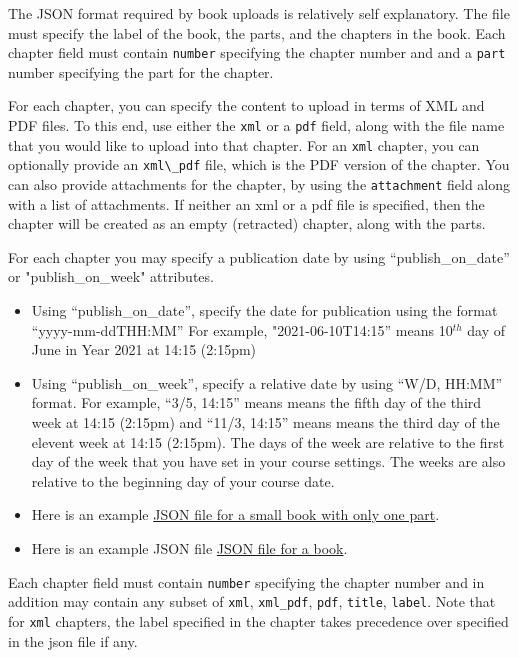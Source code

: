 \begin{gram}
The JSON format required by book uploads is relatively self explanatory.
The file must specify the label of the book, the parts, and the chapters in the book. 
%
Each chapter field must contain \verb|number| specifying the chapter
number and and a \verb|part| number specifying the part for the chapter.

For each chapter, you can specify the content to upload in terms of
XML and PDF files.  To this end, use either the \lstinline{xml} or a
\lstinline{pdf} field, along with the file name that you would like to
upload into that chapter.
%
For an \lstinline{xml} chapter, you can optionally provide an
\lstinline{xml\_pdf} file, which is the PDF version of the chapter.
%
You can also provide attachments for the chapter, by using the
\lstinline{attachment} field along with a list of attachments.
%
If neither an xml or a pdf file is specified, then the chapter will be
created as an empty (retracted) chapter, along with the parts.


For each chapter you may specify a publication date by using
``publish_on_date'' or "publish_on_week" attributes.


\begin{itemize}
\item Using ``publish_on_date'', specify the date for publication
  using the format ``yyyy-mm-ddTHH:MM'' For example,
  "2021-06-10T14:15'' means 10$^{th}$ day of June in Year 2021 at
  14:15 (2:15pm)
\item Using ``publish_on_week'', specify a relative date by using
  ``W/D, HH:MM'' format.  For example, ``3/5, 14:15'' means means the
  fifth day of the third week at 14:15 (2:15pm) and ``11/3, 14:15''
  means means the third day of the elevent week at 14:15 (2:15pm).
  The days of the week are relative to the first day of the week that
  you have set in your course settings.  The weeks are also relative
  to the beginning day of your course date.
\end{itemize}


\begin{itemize}
\item Here is an example 
\href{file://cli/attachments/booklet-example.json}
{JSON file for a small book with only one part}.
\item Here is an example JSON file 
\href{file://cli/attachment/book-example.json}
{JSON file for a book}.
\end{itemize}

Each chapter field must contain \verb|number| specifying the chapter
number and in addition may contain any subset of \verb|xml|,
\verb|xml_pdf|, \verb|pdf|, \verb|title|, \verb|label|.  Note that for
\verb|xml| chapters, the label specified in the chapter takes
precedence over specified in the json file if any.

\end{gram}


